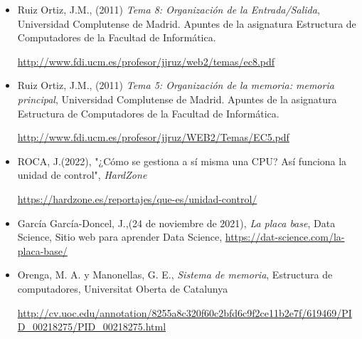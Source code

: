 \documentclass{book}
\begin{document}
\begin{large}

    \begin{itemize}

        \item Ruiz Ortiz, J.M., (2011) \textit{Tema 8: Organización de la Entrada/Salida}, Universidad Complutense de Madrid. Apuntes de la asignatura Estructura de Computadores de la Facultad de Informática.

              \url{http://www.fdi.ucm.es/profesor/jjruz/web2/temas/ec8.pdf }

        \item Ruiz Ortiz, J.M., (2011) \textit{Tema 5: Organización de la memoria: memoria principal}, Universidad Complutense de Madrid. Apuntes de la asignatura Estructura de Computadores de la Facultad de Informática.

              \url{http://www.fdi.ucm.es/profesor/jjruz/WEB2/Temas/EC5.pdf}

        \item ROCA, J.(2022), "¿Cómo se gestiona a sí misma una CPU? Así funciona la unidad de control", \textit{HardZone}

              \url{https://hardzone.es/reportajes/que-es/unidad-control/}

        \item García García-Doncel, J.,(24 de noviembre de 2021), \textit{La placa base}, Data Science, Sitio web para aprender Data Science, \url{https://dat-science.com/la-placa-base/}

        \item  Orenga, M. A. y  Manonellas, G. E., \textit{Sistema de memoria}, Estructura de computadores, Universitat Oberta de Catalunya

              \url{http://cv.uoc.edu/annotation/8255a8c320f60c2bfd6c9f2ce11b2e7f/619469/PID\_00218275/PID\_00218275.html}

    \end{itemize}

\end{large}

\end{document}
